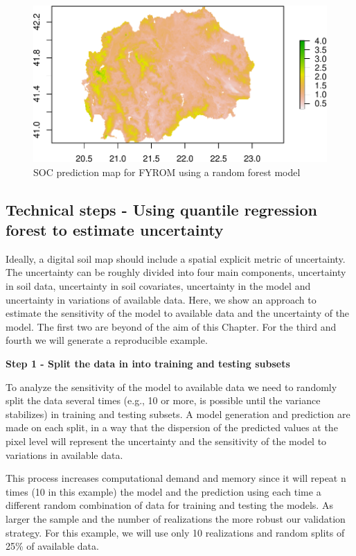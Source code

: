 \documentclass[10pt,b5paper,]{book}
\theoremstyle{definition}
\theoremstyle{definition}
\theoremstyle{definition}
\theoremstyle{remark}
\begin{document}
\begin{figure}
\centering
\includegraphics{SOCMapping_files/figure-latex/rf-pred-1.pdf}
\caption{\label{fig:rf-pred}SOC prediction map for FYROM using a random
forest model}
\end{figure}

\hypertarget{technical-steps---using-quantile-regression-forest-to-estimate-uncertainty}{%
\subsection{Technical steps - Using quantile regression forest to
estimate
uncertainty}\label{technical-steps---using-quantile-regression-forest-to-estimate-uncertainty}}

Ideally, a digital soil map should include a spatial explicit metric of
uncertainty. The uncertainty can be roughly divided into four main
components, uncertainty in soil data, uncertainty in soil covariates,
uncertainty in the model and uncertainty in variations of available
data. Here, we show an approach to estimate the sensitivity of the model
to available data and the uncertainty of the model. The first two are
beyond of the aim of this Chapter. For the third and fourth we will
generate a reproducible example.

\textbf{Step 1 - Split the data in into training and testing subsets}

To analyze the sensitivity of the model to available data we need to
randomly split the data several times (e.g., 10 or more, is possible
until the variance stabilizes) in training and testing subsets. A model
generation and prediction are made on each split, in a way that the
dispersion of the predicted values at the pixel level will represent the
uncertainty and the sensitivity of the model to variations in available
data.

This process increases computational demand and memory since it will
repeat n times (10 in this example) the model and the prediction using
each time a different random combination of data for training and
testing the models. As larger the sample and the number of realizations
the more robust our validation strategy. For this example, we will use
only 10 realizations and random splits of 25\% of available data.
\end{document}
